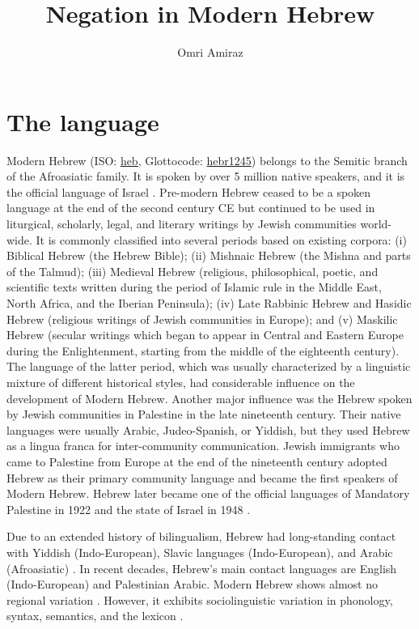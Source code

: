 \documentclass[output=paper,colorlinks,citecolor=brown]{langscibook}
\author{Omri Amiraz\affiliation{}}
\title{Negation in Modern Hebrew}
\begin{document}
\maketitle 

\section{The language} \label{sec:heb:1}
\largerpage
Modern Hebrew (ISO: \href{https://iso639-3.sil.org/code/heb}{heb}, Glottocode: \href{https://glottolog.org/resource/languoid/id/hebr1245}{hebr1245}) belongs to the Semitic branch of the Afroasiatic family. It is spoken by over 5 million native speakers, and it is the official language of Israel \citep{EberhardEtAl2023}. Pre-modern Hebrew ceased to be a spoken language at the end of the second century CE but continued to be used in liturgical, scholarly, legal, and literary writings by Jewish communities world-wide. It is commonly classified into several periods based on existing corpora: (i) Biblical Hebrew (the Hebrew Bible); (ii) Mishnaic Hebrew (the Mishna and parts of the Talmud); (iii) Medieval Hebrew (religious, philosophical, poetic, and scientific texts written during the period of Islamic rule in the Middle East, North Africa, and the Iberian Peninsula); (iv) Late Rabbinic Hebrew and Hasidic Hebrew (religious writings of Jewish communities in Europe); and (v) Maskilic Hebrew (secular writings which began to appear in Central and Eastern Europe during the Enlightenment, starting from the middle of the eighteenth century). The language of the latter period, which was usually characterized by a linguistic mixture of different historical styles, had considerable influence on the development of Modern Hebrew. Another major influence was the Hebrew spoken by Jewish communities in Palestine in the late nineteenth century. Their native languages were usually Arabic, Judeo-Spanish, or Yiddish, but they used Hebrew as a lingua franca for inter-community communication. Jewish immigrants who came to Palestine from Europe at the end of the nineteenth century adopted Hebrew as their primary community language and became the first speakers of Modern Hebrew. Hebrew later became one of the official languages of Mandatory Palestine in 1922 and the state of Israel in 1948 \citep[2--4]{Doron2015}.

Due to an extended history of bilingualism, Hebrew had long-standing contact with Yiddish (Indo-European), Slavic languages (Indo-European), and Arabic (Afroasiatic) \citep[7]{Doron2015}. In recent decades, Hebrew’s main contact languages are English (Indo-European) and Palestinian Arabic. Modern Hebrew shows almost no regional variation \citep[313]{Berman1997}. However, it exhibits sociolinguistic variation in phonology, syntax, semantics, and the lexicon \citep{Henshke2013}. 
\end{document}

